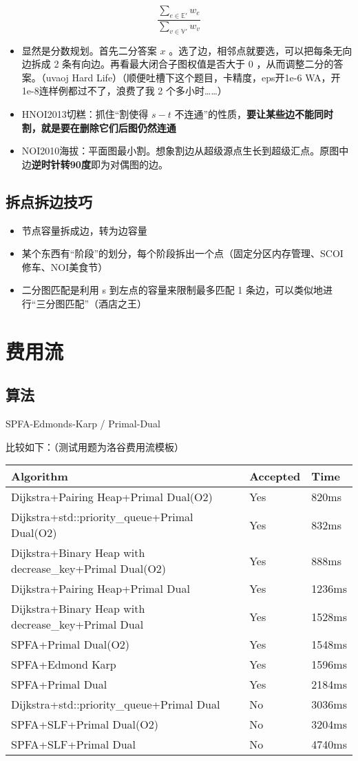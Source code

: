 \documentclass[]{ctexart}
\begin{document}
\[\frac{\sum_{e \in \mathbb{E'}}w_e}{\sum_{v \in \mathbb{V'}}w_v}\]

\begin{itemize}
\item
  显然是分数规划。首先二分答案 \(x\)
  。选了边，相邻点就要选，可以把每条无向边拆成 2
  条有向边。再看最大闭合子图权值是否大于 0 ，从而调整二分的答案。（uvaoj
  Hard Life）（顺便吐槽下这个题目，卡精度，eps开1e-6
  WA，开1e-8连样例都过不了，浪费了我 2 个多小时\ldots{}\ldots{}）
\item
  HNOI2013切糕：抓住``割使得 \(s-t\)
  不连通''的性质，\textbf{要让某些边不能同时割，就是要在删除它们后图仍然连通}
\item
  NOI2010海拔：平面图最小割。想象割边从超级源点生长到超级汇点。原图中边\textbf{逆时针转90度}即为对偶图的边。
\end{itemize}

\hypertarget{header-n506}{%
\subsection{拆点拆边技巧}\label{header-n506}}

\begin{itemize}
\item
  节点容量拆成边，转为边容量
\item
  某个东西有``阶段''的划分，每个阶段拆出一个点（固定分区内存管理、SCOI修车、NOI美食节）
\item
  二分图匹配是利用 s 到左点的容量来限制最多匹配 1
  条边，可以类似地进行``三分图匹配''（酒店之王）
\end{itemize}

\hypertarget{header-n517}{%
\section{费用流}\label{header-n517}}

\hypertarget{header-n518}{%
\subsection{算法}\label{header-n518}}

SPFA-Edmonds-Karp / Primal-Dual

比较如下：（测试用题为洛谷费用流模板）\\

\begin{longtable}[]{@{}lll@{}}
\toprule
Algorithm & Accepted & Time\tabularnewline
\midrule
Dijkstra+Pairing Heap+Primal Dual(O2) & Yes & 820ms\tabularnewline
Dijkstra+std::priority\_queue+Primal Dual(O2) & Yes &
832ms\tabularnewline
Dijkstra+Binary Heap with decrease\_key+Primal Dual(O2) & Yes &
888ms\tabularnewline
Dijkstra+Pairing Heap+Primal Dual & Yes & 1236ms\tabularnewline
Dijkstra+Binary Heap with decrease\_key+Primal Dual & Yes &
1528ms\tabularnewline
SPFA+Primal Dual(O2) & Yes & 1548ms\tabularnewline
SPFA+Edmond Karp & Yes & 1596ms\tabularnewline
SPFA+Primal Dual & Yes & 2184ms\tabularnewline
Dijkstra+std::priority\_queue+Primal Dual & No & 3036ms\tabularnewline
SPFA+SLF+Primal Dual(O2) & No & 3204ms\tabularnewline
SPFA+SLF+Primal Dual & No & 4740ms\tabularnewline
\bottomrule
\end{longtable}
\end{document}
